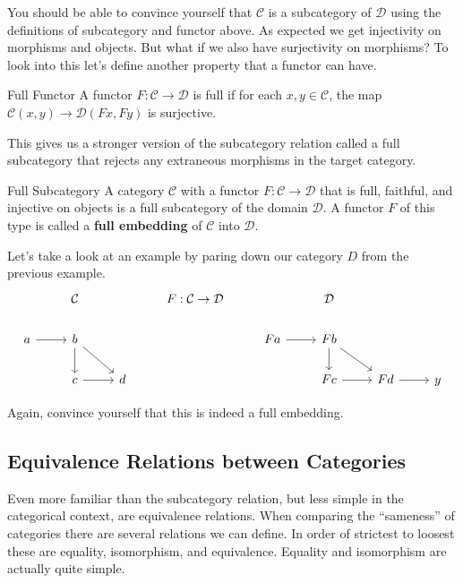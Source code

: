 \documentclass[12pt]{article}
\newcounter{examp}
\begin{document}
You should be able to convince yourself that $\mathcal{C}$ is a subcategory of $\mathcal{D}$ using the definitions of subcategory and functor above.
As expected we get injectivity on morphisms and objects.
But what if we also have surjectivity on morphisms?
To look into this let's define another property that a functor can have.

\begin{definition}{Full Functor}{}
    A functor $F:\mathcal{C}\rightarrow\mathcal{D}$ is full if for each $x,y\in\mathcal{C}$, the map $\mathcal{C}(x, y)\rightarrow\mathcal{D}(Fx,Fy)$ is surjective.
\end{definition}

This gives us a stronger version of the subcategory relation called a full subcategory that rejects any extraneous morphisms in the target category.

\begin{definition}{Full Subcategory}{}
    A category $\mathcal{C}$ with a functor $F:\mathcal{C}\rightarrow\mathcal{D}$ that is full, faithful, and injective on objects is a full subcategory of the domain $\mathcal{D}$.
    A functor $F$ of this type is called a \textbf{full embedding} of $\mathcal{C}$ into $\mathcal{D}$.
\end{definition}

Let's take a look at an example by paring down our category $D$ from the previous example.
\[\begin{tikzcd}
        & {\mathcal{C}} && {F:\mathcal{C}\rightarrow\mathcal{D}} && {\mathcal{D}} \\
        a & b &&& Fa & Fb \\
        & c & d &&& Fc & Fd & y
        \arrow[from=2-1, to=2-2]
        \arrow[from=2-2, to=3-2]
        \arrow[from=3-2, to=3-3]
        \arrow[from=2-2, to=3-3]
        \arrow[from=2-5, to=2-6]
        \arrow[from=2-6, to=3-7]
        \arrow[from=3-6, to=3-7]
        \arrow[from=2-6, to=3-6]
        \arrow[from=3-7, to=3-8]
    \end{tikzcd}\]

Again, convince yourself that this is indeed a full embedding.



\subsection*{Equivalence Relations between Categories}
Even more familiar than the subcategory relation, but less simple in the categorical context, are equivalence relations.
When comparing the ``sameness'' of categories there are several relations we can define.
In order of strictest to loosest these are equality, isomorphism, and equivalence.
Equality and isomorphism are actually quite simple.
\end{document}
